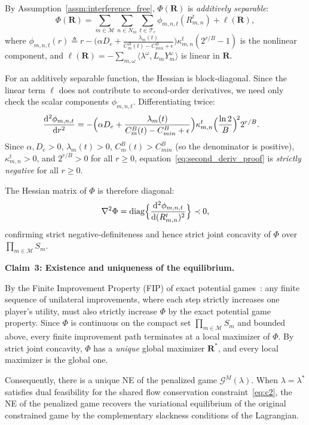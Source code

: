 \documentclass[journal]{IEEEtran}
\newcommand{\CB}{C^{B}}
\newcommand{\CBmin}{C^{B}_{min}}
\newcommand{\calM}{\mathcal{M}}
\newcommand{\calG}{\mathcal{G}}
\newcommand{\calT}{\mathcal{T}}
\newcommand{\bfR}{\mathbf{R}}
\begin{document}
\begin{IEEEproof}
By Assumption~\ref{assm:interference_free}, $\Phi(\bfR)$ is \emph{additively separable}:
\begin{equation}
    \Phi(\bfR) = \sum_{m\in\calM}\sum_{n\in N_m}
    \sum_{t\in\calT_e}
    \phi_{m,n,t}(R_{m,n}^t) + \ell(\bfR),
\end{equation}
where $\phi_{m,n,t}(r) \triangleq r - \bigl(\alpha D_e + \frac{\lambda_m(t)}{\CB_m(t)-\CBmin+\epsilon}\bigr)
\kappa_{m,n}^t(2^{r/B}-1)$
is the nonlinear component, and $\ell(\bfR) = -\sum_{m,\omega}
\langle\lambda^\omega, L_m Y_m^\omega\rangle$
is linear in $\bfR$.

For an additively separable function, the Hessian is block-diagonal. Since the linear term $\ell$ does not contribute to second-order derivatives, we need only check the scalar components $\phi_{m,n,t}$. Differentiating twice:
\begin{align}
    \frac{\mathrm{d}^2\phi_{m,n,t}}{\mathrm{d}r^2}
    &= -\Bigl(\alpha D_e
    + \frac{\lambda_m(t)}%
    {\CB_m(t)-\CBmin+\epsilon}\Bigr)
    \kappa_{m,n}^t
    \Bigl(\frac{\ln 2}{B}\Bigr)^{\!2}
    2^{r/B}.
    \label{eq:second_deriv_proof}
\end{align}
Since $\alpha, D_e > 0$, $\lambda_m(t) > 0$, $\CB_m(t) > \CBmin$ (so the denominator is positive), $\kappa_{m,n}^t > 0$, and $2^{r/B} > 0$ for all $r \geq 0$, equation~\eqref{eq:second_deriv_proof} is \emph{strictly negative} for all $r\geq 0$.

The Hessian matrix of $\Phi$ is therefore diagonal:
\begin{equation}
    \nabla^2\Phi = \mathrm{diag}
    \Bigl\{\frac{\mathrm{d}^2\phi_{m,n,t}}%
    {\mathrm{d}(R_{m,n}^t)^2}\Bigr\}
    \prec 0,
\end{equation}
confirming strict negative-definiteness and hence strict joint concavity of $\Phi$ over $\prod_{m\in\calM} S_m$.

\smallskip
\noindent\textbf{Claim~3: Existence and uniqueness
of the equilibrium.}

By the Finite Improvement Property (FIP) of exact potential games~\cite{monderer1996potential}: any finite sequence of unilateral improvements, where each step strictly increases one player's utility, must also strictly increase $\Phi$ by the exact potential game property. Since $\Phi$ is continuous on the compact set $\prod_{m\in\calM} S_m$ and bounded above, every finite improvement path terminates at a local maximizer of $\Phi$. By strict joint concavity, $\Phi$ has a \emph{unique} global maximizer $\bfR^*$, and every local maximizer is the global one.

Consequently, there is a unique NE of the penalized game $\calG^M(\lambda)$. When $\lambda = \lambda^*$ satisfies dual feasibility for the shared flow conservation constraint~\eqref{eq:c2}, the NE of the penalized game recovers the variational equilibrium of the original constrained game by the complementary slackness conditions of the Lagrangian.
\end{IEEEproof}
\end{document}
